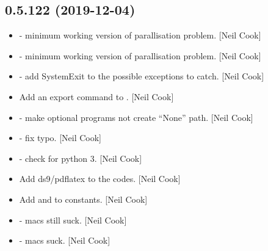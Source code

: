\documentclass[a4paper,10pt,english]{report}
\begin{document}
\subsection{0.5.122 (2019-12-04)}
\label{\detokenize{misc/changelog:id21}}\begin{itemize}
\item {} 
 - minimum working version of
parallisation problem. {[}Neil Cook{]}

\item {} 
 - minimum working version of
parallisation problem. {[}Neil Cook{]}

\item {} 
 - add SystemExit to the possible exceptions
to catch. {[}Neil Cook{]}

\item {} 
Add an export command to . {[}Neil Cook{]}

\item {} 
 - make optional programs not
create “None” path. {[}Neil Cook{]}

\item {} 
 - fix typo. {[}Neil Cook{]}

\item {} 
 - check for python 3. {[}Neil Cook{]}

\item {} 
Add ds9/pdflatex to the codes. {[}Neil Cook{]}

\item {} 
Add  and  to constants. {[}Neil Cook{]}

\item {} 
 - macs still suck. {[}Neil Cook{]}

\item {} 
 - macs suck. {[}Neil Cook{]}

\end{itemize}
\end{document}
